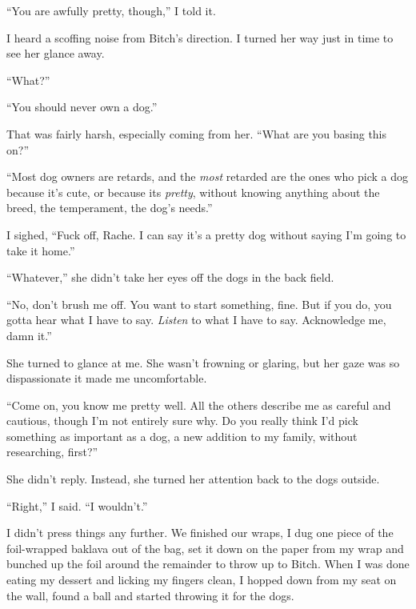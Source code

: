 ``You are awfully pretty, though,'' I told it.



I heard a scoffing noise from Bitch's direction.  I turned her way just in time to see her glance away.



``What?''



``You should never own a dog.''



That was fairly harsh, especially coming from her.  ``What are you basing this on?''



``Most dog owners are retards, and the \emph{most} retarded are the ones who pick a dog because it's cute, or because its \emph{pretty}, without knowing anything about the breed, the temperament, the dog's needs.''



I sighed, ``Fuck off, Rache.  I can say it's a pretty dog without saying I'm going to take it home.''



``Whatever,'' she didn't take her eyes off the dogs in the back field.



``No, don't brush me off.  You want to start something, fine.  But if you do, you gotta hear what I have to say.  \emph{Listen} to what I have to say.  Acknowledge me, damn it.''



She turned to glance at me.  She wasn't frowning or glaring, but her gaze was so dispassionate it made me uncomfortable.



``Come on, you know me pretty well.  All the others describe me as careful and cautious, though I'm not entirely sure why.  Do you really think I'd pick something as important as a dog, a new addition to my family, without researching, first?''



She didn't reply.  Instead, she turned her attention back to the dogs outside.



``Right,'' I said.  ``I wouldn't.''



I didn't press things any further.  We finished our wraps, I dug one piece of the foil-wrapped baklava out of the bag, set it down on the paper from my wrap and bunched up the foil around the remainder to throw up to Bitch.  When I was done eating my dessert and licking my fingers clean, I hopped down from my seat on the wall, found a ball and started throwing it for the dogs.



